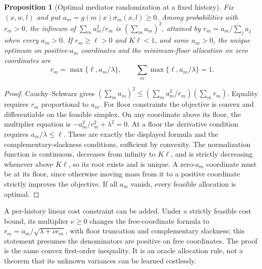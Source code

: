 \documentclass[11pt]{article}
\newtheorem{proposition}[theorem]{Proposition}
\theoremstyle{remark}
\begin{document}
\begin{proposition}[Optimal mediator randomization at a fixed history]
Fix $(x,w,l)$ and put $a_m=g(m\mid x)\sigma_m(x,l)\ge0$. Among probabilities with $r_m>0$, the infimum of $\sum_ma_m^2/r_m$ is $(\sum_ma_m)^2$, attained by $r_m=a_m/\sum_ja_j$ when every $a_m>0$. If $r_m\ge\ell>0$ and $K\ell<1$, and some $a_m>0$, the unique optimum on positive-$a_m$ coordinates and the minimum-floor allocation on zero coordinates are
\[
 r_m=\max\{\ell,a_m/\lambda\},\qquad
 \sum_m\max\{\ell,a_m/\lambda\}=1.
\]
\end{proposition}
\begin{proof}
Cauchy--Schwarz gives $(\sum_ma_m)^2\le(\sum_ma_m^2/r_m)(\sum_mr_m)$. Equality requires $r_m$ proportional to $a_m$. For floor constraints the objective is convex and differentiable on the feasible simplex. On any coordinate above its floor, the multiplier equation is $-a_m^2/r_m^2+\lambda^2=0$. At a floor the derivative condition requires $a_m/\lambda\le\ell$. These are exactly the displayed formula and the complementary-slackness conditions, sufficient by convexity. The normalization function is continuous, decreases from infinity to $K\ell$, and is strictly decreasing whenever above $K\ell$, so its root exists and is unique. A zero-$a_m$ coordinate must be at its floor, since otherwise moving mass from it to a positive coordinate strictly improves the objective. If all $a_m$ vanish, every feasible allocation is optimal.
\end{proof}
A per-history linear cost constraint can be added. Under a strictly feasible cost bound, its multiplier $\nu\ge0$ changes the free-coordinate formula to $r_m=a_m/\sqrt{\lambda+\nu c_m}$, with floor truncation and complementary slackness; this statement presumes the denominators are positive on free coordinates. The proof is the same convex first-order inequality. It is an oracle allocation rule, not a theorem that its unknown variances can be learned costlessly.
\end{document}
